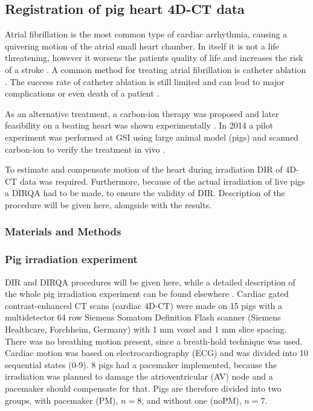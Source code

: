 \documentclass[type=dr, dr=rernat, accentcolor=tud7b,colorbacktitle, bigchapter, openright, twoside, 12pt ]{tudthesis}
\begin{document}
\newpage
\subsection{Registration of pig heart 4D-CT data}

Atrial fibrillation is the most common type of cardiac arrhythmia, causing a quivering motion of the atrial small heart chamber. 
In itself it is not a life threatening, however it worsens the patients quality of life and increases the risk of a stroke \cite{Benjamin1998}. 
A common method for treating atrial fibrillation is catheter ablation \cite{January2014}. The success rate of catheter ablation is still limited and 
can lead to major complications or even death of a patient \cite{Cappato2005,Cappato2010}.

As an alternative treatment, a carbon-ion therapy was proposed \cite{Bert2012} and later feasibility on a beating heart was shown experimentally \cite{Lehmann2015b}. In 2014 a pilot experiment was performed at GSI using large animal model (pigs) and
scanned carbon-ion to verify the treatment in vivo \cite{Lehmann2015}.

To estimate and compensate motion of the heart during irradiation DIR of 4D-CT data was required. Furthermore, because of the actual irradiation of live pigs a DIRQA had to be made, to ensure the validity of DIR. Description of the procedure will be given here,
alongside with the results.


\subsubsection{Materials and Methods}


\subsubsection{Pig irradiation experiment}

DIR and DIRQA procedures will be given here, while a detailed description of the whole pig irradiation experiment can be found elsewhere \cite{Lehmann2015}. Cardiac gated contrast-enhanced CT scans (cardiac 4D-CT) were made on 15 pigs with a multidetector 64 row Siemens Somatom Definition Flash scanner 
(Siemens Healthcare, Forchheim, Germany) with 1 mm voxel and 1 mm slice spacing. There was no breathing motion present, since a breath-hold technique was used. Cardiac motion was based on electrocardiography (ECG)
and was divided into 10 sequential states (0-9). 
8 pigs had a pacemaker implemented, because the irradiation was planned to damage the atrioventricular (AV) node and a pacemaker should compensate for that. Pigs are therefore divided into two groups, with pacemaker (PM), $n=8$, and without one (noPM), $n=7$.
\end{document}
